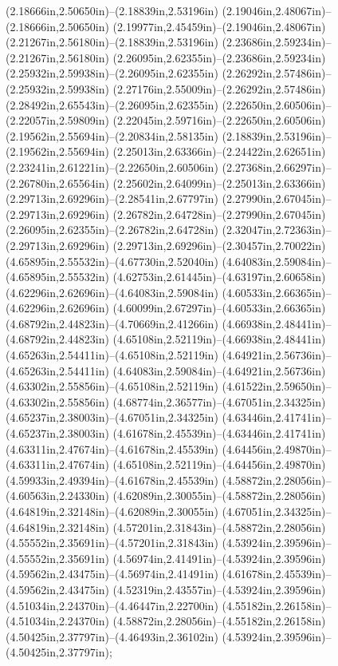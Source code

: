 (2.18666in,2.50650in)--(2.18839in,2.53196in) (2.19046in,2.48067in)--(2.18666in,2.50650in) (2.19977in,2.45459in)--(2.19046in,2.48067in) (2.21267in,2.56180in)--(2.18839in,2.53196in) (2.23686in,2.59234in)--(2.21267in,2.56180in) (2.26095in,2.62355in)--(2.23686in,2.59234in) (2.25932in,2.59938in)--(2.26095in,2.62355in) (2.26292in,2.57486in)--(2.25932in,2.59938in) (2.27176in,2.55009in)--(2.26292in,2.57486in) (2.28492in,2.65543in)--(2.26095in,2.62355in) (2.22650in,2.60506in)--(2.22057in,2.59809in) (2.22045in,2.59716in)--(2.22650in,2.60506in) (2.19562in,2.55694in)--(2.20834in,2.58135in) (2.18839in,2.53196in)--(2.19562in,2.55694in) (2.25013in,2.63366in)--(2.24422in,2.62651in) (2.23241in,2.61221in)--(2.22650in,2.60506in) (2.27368in,2.66297in)--(2.26780in,2.65564in) (2.25602in,2.64099in)--(2.25013in,2.63366in) (2.29713in,2.69296in)--(2.28541in,2.67797in) (2.27990in,2.67045in)--(2.29713in,2.69296in) (2.26782in,2.64728in)--(2.27990in,2.67045in) (2.26095in,2.62355in)--(2.26782in,2.64728in) (2.32047in,2.72363in)--(2.29713in,2.69296in) (2.29713in,2.69296in)--(2.30457in,2.70022in) (4.65895in,2.55532in)--(4.67730in,2.52040in) (4.64083in,2.59084in)--(4.65895in,2.55532in) (4.62753in,2.61445in)--(4.63197in,2.60658in) (4.62296in,2.62696in)--(4.64083in,2.59084in) (4.60533in,2.66365in)--(4.62296in,2.62696in) (4.60099in,2.67297in)--(4.60533in,2.66365in) (4.68792in,2.44823in)--(4.70669in,2.41266in) (4.66938in,2.48441in)--(4.68792in,2.44823in) (4.65108in,2.52119in)--(4.66938in,2.48441in) (4.65263in,2.54411in)--(4.65108in,2.52119in) (4.64921in,2.56736in)--(4.65263in,2.54411in) (4.64083in,2.59084in)--(4.64921in,2.56736in) (4.63302in,2.55856in)--(4.65108in,2.52119in) (4.61522in,2.59650in)--(4.63302in,2.55856in) (4.68774in,2.36577in)--(4.67051in,2.34325in) (4.65237in,2.38003in)--(4.67051in,2.34325in) (4.63446in,2.41741in)--(4.65237in,2.38003in) (4.61678in,2.45539in)--(4.63446in,2.41741in) (4.63311in,2.47674in)--(4.61678in,2.45539in) (4.64456in,2.49870in)--(4.63311in,2.47674in) (4.65108in,2.52119in)--(4.64456in,2.49870in) (4.59933in,2.49394in)--(4.61678in,2.45539in) (4.58872in,2.28056in)--(4.60563in,2.24330in) (4.62089in,2.30055in)--(4.58872in,2.28056in) (4.64819in,2.32148in)--(4.62089in,2.30055in) (4.67051in,2.34325in)--(4.64819in,2.32148in) (4.57201in,2.31843in)--(4.58872in,2.28056in) (4.55552in,2.35691in)--(4.57201in,2.31843in) (4.53924in,2.39596in)--(4.55552in,2.35691in) (4.56974in,2.41491in)--(4.53924in,2.39596in) (4.59562in,2.43475in)--(4.56974in,2.41491in) (4.61678in,2.45539in)--(4.59562in,2.43475in) (4.52319in,2.43557in)--(4.53924in,2.39596in) (4.51034in,2.24370in)--(4.46447in,2.22700in) (4.55182in,2.26158in)--(4.51034in,2.24370in) (4.58872in,2.28056in)--(4.55182in,2.26158in) (4.50425in,2.37797in)--(4.46493in,2.36102in) (4.53924in,2.39596in)--(4.50425in,2.37797in);
